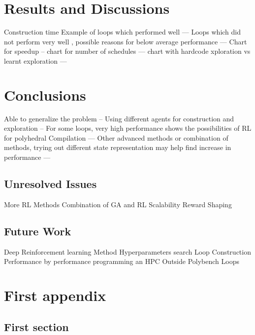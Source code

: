 \documentclass[logo,msc]{infthesis}           %
\begin{document}
\chapter{Results and Discussions}
Construction time
Example of loops which performed well ---
Loops which did not perform very well , possible reasons for below average performance --- 
Chart for speedup -- 
chart for number of schedules ---
chart with hardcode xploration vs learnt exploration ---
\chapter{Conclusions}

Able to generalize the problem -- 
Using different agents for construction and exploration --
For some loops, very high performance shows the possibilities of RL for polyhedral Compilation --- 
Other advanced methods or combination of methods, trying out different state representation may help find increase in performance --- 

\section{Unresolved Issues}

More RL Methods
Combination of GA and RL
Scalability
Reward Shaping

\section{Future Work}
Deep Reinforcement learning Method
Hyperparameters search
Loop Construction Performance by performance programming an HPC
Outside Polybench Loops





\appendix

\chapter{First appendix}

\section{First section}
\end{document}
